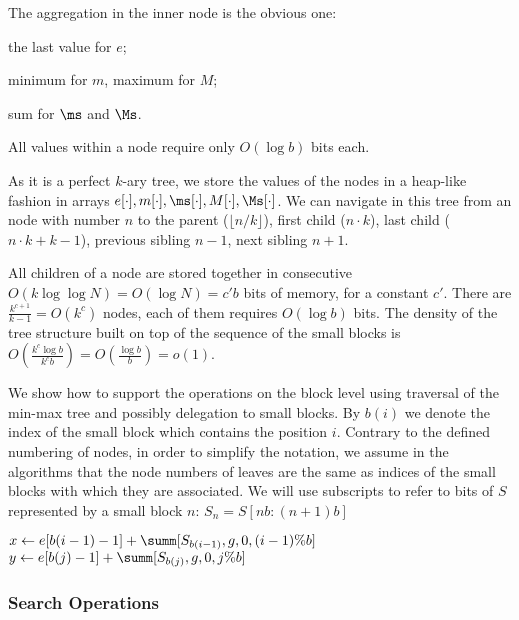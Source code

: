 The aggregation in the inner node is the obvious one:
\begin{iteminline}
	\item the last value for $e$;
	\item minimum for $m$, maximum for $M$;
	\item sum for $\ms$ and $\Ms$.
\end{iteminline}
All values within a node require only $O(\log b)$ bits each.

As it is a perfect $k$-ary tree, we store the values of the nodes in a heap-like fashion in arrays $e[\cdot], m[\cdot], \ms[\cdot], M[\cdot], \Ms[\cdot]$.
We can navigate in this tree from an node with number $n$ to the parent ($\lfloor n / k \rfloor$), first child ($n \cdot k$), last child ($n \cdot k + k - 1$), previous sibling $n - 1$, next sibling $n + 1$.

All children of a node are stored together in consecutive $O(k \log \log N) = O(\log N) = c' b$ bits of memory, for a constant $c'$.
There are $\frac{k^{c + 1}}{k - 1} = O(k^c)$ nodes, each of them requires $O(\log b)$ bits.
The density of the tree structure built on top of the sequence of the small blocks is $O(\frac{k^c \log b}{k^c b}) = O(\frac{\log b}{b}) = o(1)$.

\bigskip

We show how to support the operations on the block level using traversal of the min-max tree and possibly delegation to small blocks.
By $b(i)$ we denote the index of the small block which contains the position $i$.
Contrary to the defined numbering of nodes, in order to simplify the notation, we assume in the algorithms that the node numbers of leaves are the same as indices of the small blocks with which they are associated.
We will use subscripts to refer to bits of $S$ represented by a small block $n$: $S_n = S[n b : (n + 1) b]$

\begin{algorithm}
\begin{algorithmic}
	\State $x \gets e[b(i - 1) - 1] + \summ[S_{b(i - 1)}, g, 0, (i - 1) \% b]$
	\State $y \gets e[b(j) - 1] + \summ[S_{b(j)}, g, 0, j \% b]$
	\State {}
\EndFunction
\end{algorithmic}
\end{algorithm}

\subsubsection{Search Operations}

